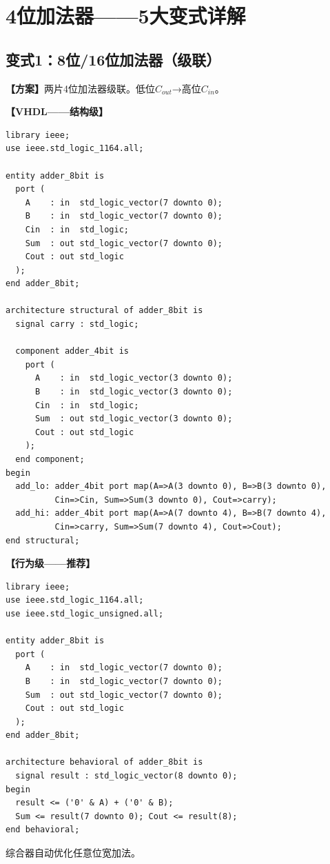 \chapter{4位加法器——5大变式详解}

\section{变式1：8位/16位加法器（级联）}

\begin{detailbox}[完整教学]
\textbf{【方案】}两片4位加法器级联。低位$C_{out}$→高位$C_{in}$。

\textbf{【VHDL——结构级】}
\begin{lstlisting}[caption={8位加法器结构级实现（两片4位级联）}]
library ieee;
use ieee.std_logic_1164.all;

entity adder_8bit is
  port (
    A    : in  std_logic_vector(7 downto 0);
    B    : in  std_logic_vector(7 downto 0);
    Cin  : in  std_logic;
    Sum  : out std_logic_vector(7 downto 0);
    Cout : out std_logic
  );
end adder_8bit;

architecture structural of adder_8bit is
  signal carry : std_logic;

  component adder_4bit is
    port (
      A    : in  std_logic_vector(3 downto 0);
      B    : in  std_logic_vector(3 downto 0);
      Cin  : in  std_logic;
      Sum  : out std_logic_vector(3 downto 0);
      Cout : out std_logic
    );
  end component;
begin
  add_lo: adder_4bit port map(A=>A(3 downto 0), B=>B(3 downto 0),
          Cin=>Cin, Sum=>Sum(3 downto 0), Cout=>carry);
  add_hi: adder_4bit port map(A=>A(7 downto 4), B=>B(7 downto 4),
          Cin=>carry, Sum=>Sum(7 downto 4), Cout=>Cout);
end structural;
\end{lstlisting}

\textbf{【行为级——推荐】}
\begin{lstlisting}[caption={8位加法器行为级实现}]
library ieee;
use ieee.std_logic_1164.all;
use ieee.std_logic_unsigned.all;

entity adder_8bit is
  port (
    A    : in  std_logic_vector(7 downto 0);
    B    : in  std_logic_vector(7 downto 0);
    Sum  : out std_logic_vector(7 downto 0);
    Cout : out std_logic
  );
end adder_8bit;

architecture behavioral of adder_8bit is
  signal result : std_logic_vector(8 downto 0);
begin
  result <= ('0' & A) + ('0' & B);
  Sum <= result(7 downto 0); Cout <= result(8);
end behavioral;
\end{lstlisting}
综合器自动优化任意位宽加法。
\end{detailbox}


